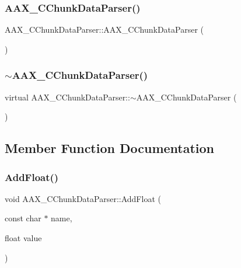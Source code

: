 \subsubsection{\texorpdfstring{AAX\_CChunkDataParser()}{AAX\_CChunkDataParser()}}
{\footnotesize\ttfamily A\+A\+X\+\_\+\+C\+Chunk\+Data\+Parser\+::\+A\+A\+X\+\_\+\+C\+Chunk\+Data\+Parser (\begin{DoxyParamCaption}{ }\end{DoxyParamCaption})}

\mbox{\label{a01461_a4a31f21eaad9742482051f05f08fb72b}} 
\subsubsection{\texorpdfstring{$\sim$AAX\_CChunkDataParser()}{~AAX\_CChunkDataParser()}}
{\footnotesize\ttfamily virtual A\+A\+X\+\_\+\+C\+Chunk\+Data\+Parser\+::$\sim$\+A\+A\+X\+\_\+\+C\+Chunk\+Data\+Parser (\begin{DoxyParamCaption}{ }\end{DoxyParamCaption})\hspace{0.3cm}{\ttfamily [virtual]}}



\subsection{Member Function Documentation}
\mbox{\label{a01461_aa85606ec7ad6e142abceb1097dcd2480}} 
\subsubsection{\texorpdfstring{AddFloat()}{AddFloat()}}
{\footnotesize\ttfamily void A\+A\+X\+\_\+\+C\+Chunk\+Data\+Parser\+::\+Add\+Float (\begin{DoxyParamCaption}\item[{const char $\ast$}]{name,  }\item[{float}]{value }\end{DoxyParamCaption})}



